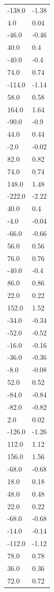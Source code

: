 \begin{longtable}{ll}
-138.0 & -1.38 \\
4.0 & 0.04 \\
-46.0 & -0.46 \\
40.0 & 0.4 \\
-40.0 & -0.4 \\
74.0 & 0.74 \\
-114.0 & -1.14 \\
58.0 & 0.58 \\
164.0 & 1.64 \\
-90.0 & -0.9 \\
44.0 & 0.44 \\
-2.0 & -0.02 \\
82.0 & 0.82 \\
74.0 & 0.74 \\
148.0 & 1.48 \\
-222.0 & -2.22 \\
40.0 & 0.4 \\
-4.0 & -0.04 \\
-66.0 & -0.66 \\
56.0 & 0.56 \\
76.0 & 0.76 \\
-40.0 & -0.4 \\
86.0 & 0.86 \\
22.0 & 0.22 \\
152.0 & 1.52 \\
-34.0 & -0.34 \\
-52.0 & -0.52 \\
-16.0 & -0.16 \\
-36.0 & -0.36 \\
-8.0 & -0.08 \\
52.0 & 0.52 \\
-84.0 & -0.84 \\
-82.0 & -0.82 \\
2.0 & 0.02 \\
-126.0 & -1.26 \\
112.0 & 1.12 \\
156.0 & 1.56 \\
-68.0 & -0.68 \\
18.0 & 0.18 \\
48.0 & 0.48 \\
22.0 & 0.22 \\
-68.0 & -0.68 \\
-14.0 & -0.14 \\
-112.0 & -1.12 \\
78.0 & 0.78 \\
36.0 & 0.36 \\
72.0 & 0.72 \\

\end{longtable}
